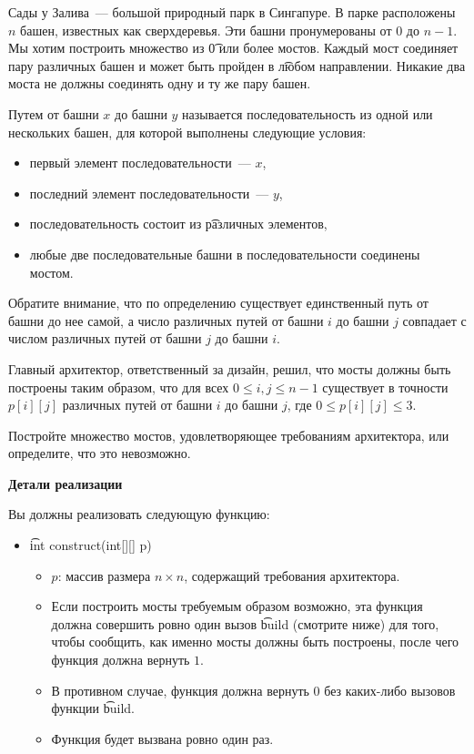 Сады у Залива~--- большой природный парк в Сингапуре. В парке расположены $n$ башен, известных как сверхдеревья. Эти башни пронумерованы от $0$ до $n - 1$. Мы хотим построить множество из \t{0 или более} мостов. Каждый мост соединяет пару различных башен и может быть пройден в \t{любом} направлении. Никакие два моста не должны соединять одну и ту же пару башен.

Путем от башни $x$ до башни $y$ называется последовательность из одной или нескольких башен, для которой выполнены следующие условия:
\begin{itemize}
\item первый элемент последовательности~--- $x$,
\item последний элемент последовательности~--- $y$,
\item последовательность состоит из \t{различных} элементов,
\item любые две последовательные башни в последовательности соединены мостом.
\end{itemize}

Обратите внимание, что по определению существует единственный путь от башни до нее самой, а число различных путей от башни $i$ до башни $j$ совпадает с числом различных путей от башни $j$ до башни $i$.

Главный архитектор, ответственный за дизайн, решил, что мосты должны быть построены таким образом, что для всех $0 \leq i, j \leq n-1$ существует в точности $p[i][j]$ различных путей от башни $i$ до башни $j$, где $0 \leq p[i][j] \leq 3$.

Постройте множество мостов, удовлетворяющее требованиям архитектора, или определите, что это невозможно.

\textbf{Детали реализации}

Вы должны реализовать следующую функцию:

\begin{itemize}
\item \t{int construct(int[][] p)}
\begin{itemize}
\item $p$: массив размера $n \times n$, содержащий требования архитектора.
\item Если построить мосты требуемым образом возможно, эта функция должна совершить ровно один вызов \t{build} (смотрите ниже) для того, чтобы сообщить, как именно мосты должны быть построены, после чего функция должна вернуть $1$.
\item В противном случае, функция должна вернуть $0$ без каких-либо вызовов функции \t{build}.
\item Функция будет вызвана ровно один раз.
\end{itemize}
\end{itemize}


